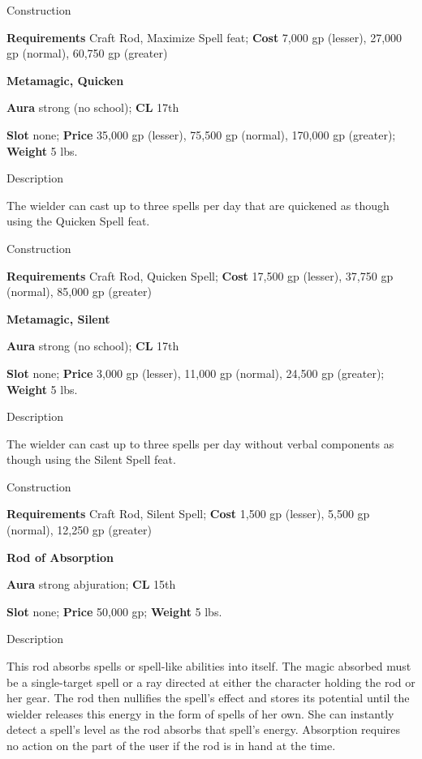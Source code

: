 Construction
				
\textbf{Requirements} Craft Rod, Maximize Spell feat; \textbf{Cost }7,000 gp (lesser), 27,000 gp (normal), 60,750 gp (greater)
				
\textbf{Metamagic, Quicken}
				
\textbf{Aura} strong (no school);\textbf{ CL }17th
				
\textbf{Slot} none; \textbf{Price} 35,000 gp (lesser), 75,500 gp (normal), 170,000 gp (greater); \textbf{Weight} 5 lbs.
				
Description
				
The wielder can cast up to three spells per day that 
are quickened
 as though using the Quicken Spell feat. 
				
Construction
				
\textbf{Requirements} Craft Rod, Quicken Spell; \textbf{Cost }17,500 gp (lesser), 37,750 gp (normal), 85,000 gp (greater)
				
\textbf{Metamagic, Silent}
				
\textbf{Aura} strong (no school);\textbf{ CL }17th
				
\textbf{Slot} none; \textbf{Price} 3,000 gp (lesser), 11,000 gp (normal), 24,500 gp (greater); \textbf{Weight} 5 lbs.
				
Description
				
The wielder can cast up to three spells per day without verbal components as though using the Silent Spell feat. 
				
Construction
				
\textbf{Requirements} Craft Rod, Silent Spell; \textbf{Cost }1,500 gp (lesser), 5,500 gp (normal), 12,250 gp (greater)
				
\textbf{Rod of Absorption}
				
\textbf{Aura} strong abjuration;\textbf{ CL }15th
				
\textbf{Slot} none; \textbf{Price} 50,000 gp; \textbf{Weight} 5 lbs.
				
Description
				
This rod absorbs spells or spell-like abilities into itself. The magic absorbed must be a single-target spell or a ray directed at either the character holding the rod or her gear. The rod then nullifies the spell's effect and stores its potential until the wielder releases this energy in the form of spells of her own. She can instantly detect a spell's level as the rod absorbs that spell's energy. Absorption requires no action on the part of the user if the rod is in hand at the time.
				
